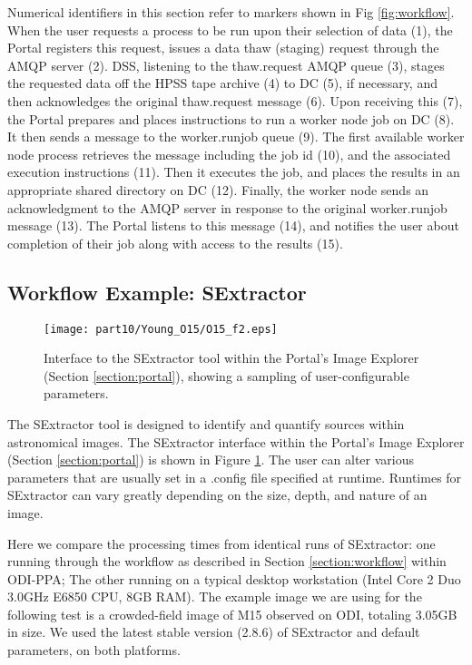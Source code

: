Numerical identifiers in this section refer to markers shown in Fig \ref{fig:workflow}.  When the user requests a process to be run upon their selection of data (1), the Portal registers this request, issues a data thaw (staging) request through the AMQP server (2).  DSS, listening to the thaw.request AMQP queue (3), stages the requested data off the HPSS tape archive (4) to DC (5), if necessary, and then acknowledges the original thaw.request message (6).  Upon receiving this (7), the Portal prepares and places instructions to run a worker node job on DC (8).  It then sends a message to the worker.runjob queue (9).   The first available worker node process retrieves the message including the job id (10), and the associated execution instructions (11). Then it executes the job, and places the results in an appropriate shared directory on DC (12).  Finally, the worker node sends an acknowledgment to the AMQP server in response to the original worker.runjob message (13). The Portal listens to this message (14), and notifies the user about completion of their job along with access to the results (15).  

\subsection{Workflow Example: SExtractor}
\label{section:sextractor}

\begin{figure}[ht]
\texttt{[image: part10/Young\_O15/O15\_f2.eps]}
\caption{Interface to the SExtractor tool within the Portal's Image Explorer (Section \ref{section:portal}), showing a sampling of user-configurable parameters.}
\label{fig:sextractor}
\end{figure}

The SExtractor tool is designed to identify and quantify sources within astronomical images.  The SExtractor interface within the Portal's Image Explorer (Section \ref{section:portal}) is shown in Figure \ref{fig:sextractor}.  The user can alter various parameters that are usually set in a .config file specified at runtime.  Runtimes for SExtractor can vary greatly depending on the size, depth, and nature of an image.  

Here we compare the processing times from identical runs of SExtractor: one running through the workflow as described in Section \ref{section:workflow} within ODI-PPA; The other running on a typical desktop workstation (Intel Core 2 Duo 3.0GHz E6850 CPU, 8GB RAM). The example image we are using for the following test is a crowded-field image of M15 observed on ODI, totaling 3.05GB in size. We used the latest stable version (2.8.6) of SExtractor and default parameters, on both platforms.


